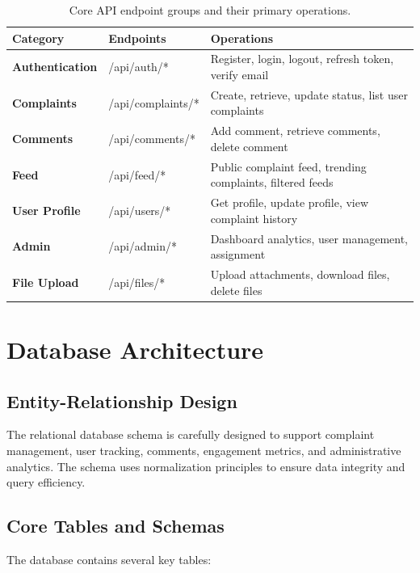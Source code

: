 \documentclass[12pt,a4paper]{report}
\begin{document}
\begin{table}[H]
\centering
\caption{Core API endpoint groups and their primary operations.}
\label{tab:api_endpoints}
\small
\begin{tabular}{p{3cm} p{3.5cm} p{7.5cm}}
\toprule
\textbf{Category} & \textbf{Endpoints} & \textbf{Operations} \\
\midrule
\textbf{Authentication} & /api/auth/* & Register, login, logout, refresh token, verify email \\
\midrule
\textbf{Complaints} & /api/complaints/* & Create, retrieve, update status, list user complaints \\
\midrule
\textbf{Comments} & /api/comments/* & Add comment, retrieve comments, delete comment \\
\midrule
\textbf{Feed} & /api/feed/* & Public complaint feed, trending complaints, filtered feeds \\
\midrule
\textbf{User Profile} & /api/users/* & Get profile, update profile, view complaint history \\
\midrule
\textbf{Admin} & /api/admin/* & Dashboard analytics, user management, assignment \\
\midrule
\textbf{File Upload} & /api/files/* & Upload attachments, download files, delete files \\
\bottomrule
\end{tabular}
\end{table}


\chapter{Database Architecture}

\section{Entity-Relationship Design}
The relational database schema is carefully designed to support complaint management, user tracking, comments, engagement metrics, and administrative analytics. The schema uses normalization principles to ensure data integrity and query efficiency.

\section{Core Tables and Schemas}
The database contains several key tables:
\end{document}
